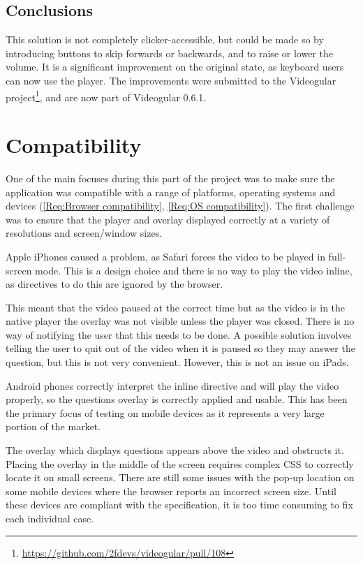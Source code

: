 \subsection{Conclusions}

This solution is not completely clicker-accessible, but could be made so by introducing buttons to skip forwards or backwards, and to raise or lower the volume. It is a significant improvement on the original state, as keyboard users can now use the player. The improvements were submitted to the \gls{Videogular} project\footnote{\url{https://github.com/2fdevs/videogular/pull/108}}, and are now part of \gls{Videogular} 0.6.1.

\section{Compatibility}
\label{Section:Compatibility}

One of the main focuses during this part of the project was to make sure the application was compatible with a range of platforms, operating systems and devices (\cref{Req:Browser compatibility}, \cref{Req:OS compatibility}). The first challenge was to ensure that the player and overlay displayed correctly at a variety of resolutions and screen/window sizes.

Apple iPhones caused a problem, as Safari forces the video to be played in full-screen mode. This is a design choice and there is no way to play the video inline, as directives to do this are ignored by the browser.

This meant that the video paused at the correct time but as the video is in the native player the overlay was not visible unless the player was closed. There is no way of notifying the user that this needs to be done. A possible solution involves telling the user to quit out of the video when it is paused so they may answer the question, but this is not very convenient. However, this is not an issue on iPads.

Android phones correctly interpret the inline directive and will play the video properly, so the questions overlay is correctly applied and usable. This has been the primary focus of testing on mobile devices as it represents a very large portion of the market.

The overlay which displays questions appears above the video and obstructs it. Placing the overlay in the middle of the screen requires complex \gls{CSS} to correctly locate it on small screens. There are still some issues with the pop-up location on some mobile devices where the browser reports an incorrect screen size. Until these devices are compliant with the specification, it is too time consuming to fix each individual case.

